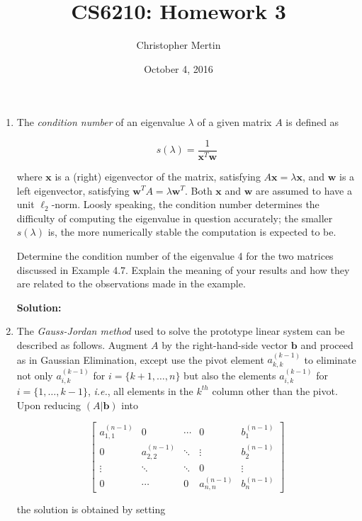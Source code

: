 \documentclass[12pt]{article}
\begin{document}
\title{CS6210: Homework 3}
\author{Christopher Mertin}
\date{October 4, 2016}
\maketitle

\begin{enumerate}
\item The {\em condition number} of an eigenvalue $\lambda$ of a given matrix $A$ is defined as

\[
s(\lambda) = \frac{1}{\mathbf{x}^{T}\mathbf{w}}
\]

where $\mathbf{x}$ is a (right) eigenvector of the matrix, satisfying $A\mathbf{x} = \lambda \mathbf{x}$,
and $\mathbf{w}$ is a left eigenvector, satisfying $\mathbf{w}^{T}A = \lambda \mathbf{w}^{T}$.
Both $\mathbf{x}$ and $\mathbf{w}$ are assumed to have a unit $\ell_{2}$-norm. Loosly speaking,
the condition number determines the difficulty of computing the eigenvalue in question accurately;
the smaller $s(\lambda)$ is, the more numerically stable the computation is expected to be.

Determine the condition number of the eigenvalue 4 for the two matrices discussed in Example 4.7.
Explain the meaning of your results and how they are related to the observations made in the example.

{\bf Solution:}

\item The {\em Gauss-Jordan method} used to solve the prototype linear system can be described
as follows. Augment $A$ by the right-hand-side vector $\mathbf{b}$ and proceed as in Gaussian Elimination,
except use the pivot element $a_{k,k}^{(k-1)}$ to eliminate not only $a_{i,k}^{(k-1)}$ for $i = \{ k+1, \ldots, n\}$
but also the elements $a_{i,k}^{(k-1)}$ for $i = \{1, \ldots, k-1\}$, {\em i.e.}, all elements in the $k^{th}$ column
other than the pivot. Upon reducing $(A|\mathbf{b})$ into

\[
\left[
\begin{array}{cccc|c}
  a_{1,1}^{(n-1)} & 0 & \cdots & 0 & b_{1}^{(n-1)}\\
  0 & a_{2,2}^{(n-1)} & \ddots & \vdots & b_{2}^{(n-1)}\\
  \vdots & \ddots & \ddots & 0 & \vdots\\
  0 & \cdots & 0 & a_{n,n}^{(n-1)} & b_{n}^{(n-1)}
\end{array}\right]
\]

the solution is obtained by setting


\end{enumerate}
\end{document}
